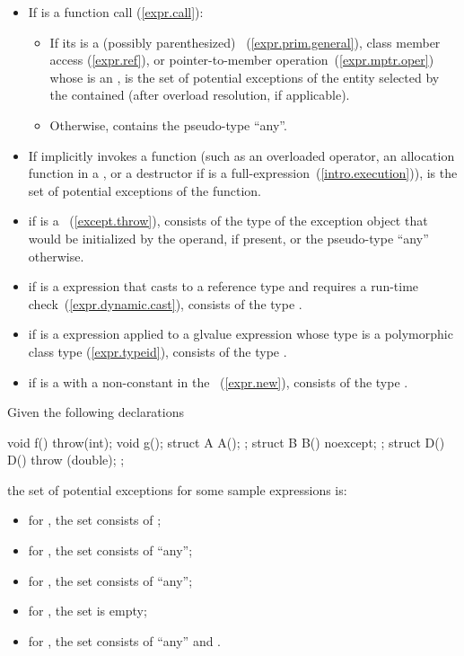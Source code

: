 \begin{itemize}
\item
If  is a function call (\ref{expr.call}):
\begin{itemize}
\item
If its  is a (possibly parenthesized)
~(\ref{expr.prim.general}), class member access
(\ref{expr.ref}), or pointer-to-member operation~(\ref{expr.mptr.oper})
whose  is an ,
 is the set of potential exceptions of the entity selected by the
contained  (after overload resolution, if applicable).
\item
Otherwise,  contains the pseudo-type ``any''.
\end{itemize}

\item
If  implicitly invokes a function (such as an overloaded operator,
an allocation function in a , or a destructor
if  is a full-expression~(\ref{intro.execution})),
 is the set of potential exceptions of the function.
\item
if  is a ~(\ref{except.throw}),
 consists of the type of the exception object that would be
initialized by the operand, if present, or the pseudo-type ``any'' otherwise.
\item
if  is a  expression that casts to a reference type and
requires a run-time check~(\ref{expr.dynamic.cast}),
 consists of the type .
\item
if  is a  expression applied to a glvalue expression whose
type is a polymorphic class type (\ref{expr.typeid}),
 consists of the type .
\item
if  is a  with a non-constant
 in the ~(\ref{expr.new}),
 consists of the type .
\end{itemize}

\enterexample
Given the following declarations
\begin{codeblock}
  void f() throw(int); 
  void g();  
  struct A { A(); };
  struct B { B() noexcept; };
  struct D() { D() throw (double); };
\end{codeblock}
the set of potential exceptions for some sample expressions is:
\begin{itemize}
\item
for , the set consists of ;
\item
for , the set consists of ``any'';
\item
for , the set consists of ``any'';
\item
for , the set is empty;
\item
for , the set consists of ``any'' and .
\end{itemize}
\exitexample

